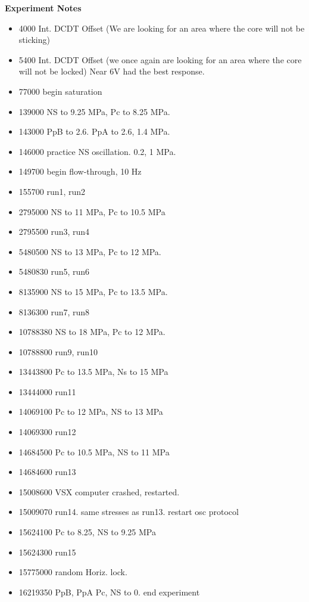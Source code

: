 \documentclass[letterpaper, 10pt]{article}
\begin{document}
\newpage 
 \textbf{Experiment Notes}
 \medskip
 {\small \begin{itemize}[label=\#]
 \setlength\itemsep{0.25em}
 	 \item 4000 Int. DCDT Offset (We are looking for an area where the core will not be sticking) 
 	 \item 5400 Int. DCDT Offset (we once again are looking for an area where the core will not be locked) Near 6V had the best response. 
 	 \item 77000 begin saturation
 	 \item 139000 NS to 9.25 MPa, Pc to 8.25 MPa. 
 	 \item 143000 PpB to 2.6. PpA to 2.6, 1.4 MPa.
 	 \item 146000 practice NS oscillation. 0.2, 1 MPa. 
 	 \item 149700 begin flow-through, 10 Hz
 	 \item 155700 run1, run2
 	 \item 2795000 NS to 11 MPa, Pc to 10.5 MPa
 	 \item 2795500 run3, run4
 	 \item 5480500 NS to 13 MPa, Pc to 12 MPa.
 	 \item 5480830 run5, run6
 	 \item 8135900 NS to 15 MPa, Pc to 13.5 MPa.
 	 \item 8136300 run7, run8
 	 \item 10788380 NS to 18 MPa, Pc to 12 MPa.
 	 \item 10788800 run9, run10
 	 \item 13443800 Pc to 13.5 MPa, Ns to 15 MPa
 	 \item 13444000 run11
 	 \item 14069100 Pc to 12 MPa, NS to 13 MPa
 	 \item 14069300 run12
 	 \item 14684500 Pc to 10.5 MPa, NS to 11 MPa
 	 \item 14684600 run13
 	 \item 15008600 VSX computer crashed, restarted.
 	 \item 15009070 run14. same stresses as run13. restart osc protocol
 	 \item 15624100 Pc to 8.25, NS to 9.25 MPa
 	 \item 15624300 run15
 	 \item 15775000 random Horiz. lock. 
 	 \item 16219350 PpB, PpA Pc, NS to 0. end experiment
 \end{itemize}} 

 
\end{document}
